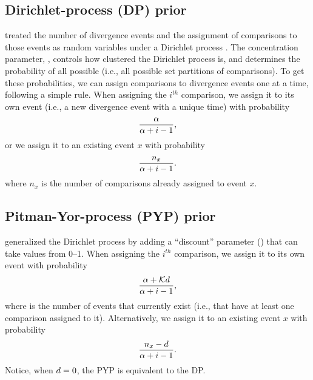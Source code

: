\subsection{Dirichlet-process (DP) prior}

\begin{linenomath}
\citet{Oaks2018ecoevolity} treated the number of divergence events and the
assignment of comparisons to those events as random variables under a Dirichlet
process \citep{Ferguson1973, Antoniak1974}.
The concentration parameter, \concentration, controls how clustered the
Dirichlet process is, and determines the probability of all possible \etimesets
(i.e., all possible set partitions of \ncomparisons comparisons).
To get these probabilities, we can assign comparisons to divergence events one
at a time, following a simple rule.
When assigning the $i^{th}$ comparison, we assign it to its own event
(i.e., a new divergence event with a unique time) with probability
\begin{equation}
    \frac{\alpha}{\alpha + i - 1},
    \label{eq:dpnewcat}
\end{equation}
or we assign it to an existing event $x$ with probability
\begin{equation}
    \frac{n_x}{\alpha + i - 1}.
    \label{eq:dpexistingcat}
\end{equation}
where $n_x$ is the number of comparisons already assigned to event $x$.
\end{linenomath}

\subsection{Pitman-Yor-process (PYP) prior}

\begin{linenomath}
\citet{PitmanYor1997} generalized the Dirichlet process by adding a
``discount'' parameter (\discount) that can take values from 0--1.
When assigning the $i^{th}$ comparison, we assign it to its own event
with probability
\begin{equation}
    \frac{\alpha + \mathcal{K} d}{\alpha + i - 1},
    \label{eq:pypnewcat}
\end{equation}
where \nexistingcats is the number of events that currently exist (i.e., that have at
least one comparison assigned to it).
Alternatively, we assign it to an existing event $x$ with probability
\begin{equation}
    \frac{n_x - d}{\alpha + i -1}.
    \label{eq:pypexistingcat}
\end{equation}
Notice, when $d = 0$, the PYP is equivalent to the DP.
\end{linenomath}


